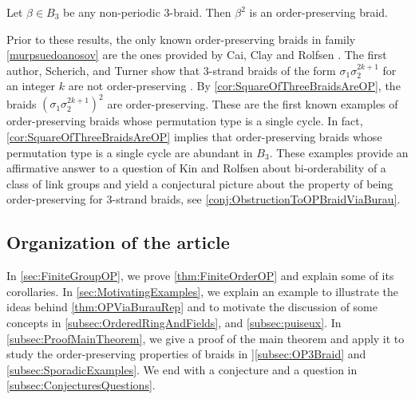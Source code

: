 \documentclass{amsart}
\begin{document}
\begin{cor}
    \label{cor:SquareOfThreeBraidsAreOP}
    Let $\beta \in B_3$ be any non-periodic 3-braid. Then $\beta^2$ is an order-preserving braid. 
\end{cor}

Prior to these results, the only known order-preserving braids in family \ref{murpsuedoanosov} are the ones provided by Cai, Clay and Rolfsen \cite{CaiClayRolfsen}. The first author, Scherich, and Turner show that 3-strand braids of the form $\sigma_1\sigma_2^{2k+1}$ for an integer $k$ are not order-preserving \cite[Theorem 7]{JohnsonScherichTurner2024}. By \cref{cor:SquareOfThreeBraidsAreOP}, the braids $(\sigma_1\sigma_2^{2k+1})^2$ are order-preserving. These are the first known examples of order-preserving braids whose permutation type is a single cycle. In fact, \cref{cor:SquareOfThreeBraidsAreOP} implies that order-preserving braids whose permutation type is a single cycle are abundant in $B_3$. These examples provide an affirmative answer to a question of Kin and Rolfsen \cite[Question 6.1]{KinRolfsen18} about bi-orderability of a class of link groups and yield a conjectural picture about the property of being order-preserving for 3-strand braids, see \cref{conj:ObstructionToOPBraidViaBurau}. 

\subsection{Organization of the article}

In \cref{sec:FiniteGroupOP}, we prove \cref{thm:FiniteOrderOP} and explain some of its corollaries. In \cref{sec:MotivatingExamples}, we explain an example to illustrate the ideas behind \cref{thm:OPViaBurauRep} and to motivate the discussion of some concepts in \cref{subsec:OrderedRingAndFields}, and \cref{subsec:puiseux}. In \cref{subsec:ProofMainTheorem}, we give a proof of the main theorem and apply it to study the order-preserving properties of braids in ]\cref{subsec:OP3Braid} and \cref{subsec:SporadicExamples}. We end with a conjecture and a question in \cref{subsec:ConjecturesQuestions}. 
\end{document}
